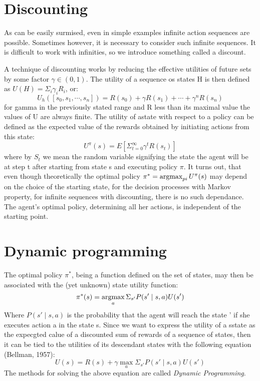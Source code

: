 \section{Discounting}
As can be easily surmised, even in simple examples infinite action sequences are possible. Sometimes however, it is necessary to consider such infinite sequences.
It is difficult to work with infinities, so we introduce something called a discount.

{
    A technique of discounting works by reducing the effective utilities of future sets by some factor $\gamma \in (0,1)$. The utility of a sequence os states H is then defined as  $U(H) = \Sigma_i\gamma_iR_i$, or:
     \begin{equation}
         U_h([s_0,s_1,\cdots ,s_n]) = R(s_0)+\gamma R(s_1) + \cdots +\gamma^{n}R(s_n)
    \end{equation}
for gamma in the previously stated range and R less than its maximal value the values of U are always finite.
}
{
    The utility of astate with respect to a policy can be defined as the expected value of the rewards obtained by initiating actions from this state:
    \begin{equation}
        U^{\pi}(s) = E[ \Sigma_{t=0}^{\infty} \gamma^{t}R(s_t)]
    \end{equation}
    where by $S_t$ we mean the random variable signifying the state the agent will be at step t after starting from state s and executing policy  $\pi $.
}
It turns out, that even though theoretically the optimal policy $\pi^* = \operatorname*{arg max}_{pi}U^{\pi}(s)$ may depend on the choice of the starting state, for the decision processes with Markov property, for infinite sequences with discounting, there is no such dependance. The agent's optimal policy, determining all her actions, is independent of the starting point.


\section{Dynamic programming}

The optimal policy $\pi^*$, being a function defined on the set of states, may then be associated with the (yet unknown) state utility function:
\begin{equation}
    \pi^*(s) = \operatorname*{arg max}_a \Sigma_{s'}P(s' \mid s,a) U(s')
\end{equation}
Where $P(s'\mid s,a)$ is the probability that the agent will reach the state ' if she executes action a in the state s.
Since we want to express the utility of a sstate as the expecgted calue of a discounted sum of rewards of a sequence of states, then it can be tied to the utilities of its descendant states with the following equation (Bellman, 1957):
 \begin{equation}
     U(s) = R(s) + \gamma \max_a \Sigma_{s'}P(s' \mid s,a) U(s')
\end{equation}
The methods for solving the above equation are called \textit{Dynamic Programming}.

